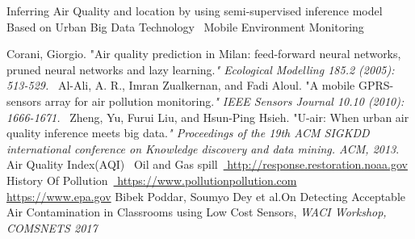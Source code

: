 \begin{thebibliography}{99}
Inferring Air Quality and location by using semi-supervised inference model Based on Urban Big Data Technology\ \url{}
Mobile Environment Monitoring\ \url{}

Corani, Giorgio. "Air quality prediction in Milan: feed-forward neural networks, pruned neural networks and lazy learning.\textit{" Ecological Modelling 185.2 (2005): 513-529.}\ \url{}
Al-Ali, A. R., Imran Zualkernan, and Fadi Aloul. "A mobile GPRS-sensors array for air pollution monitoring.\textit{" IEEE Sensors Journal 10.10 (2010): 1666-1671.}\ \url{}
Zheng, Yu, Furui Liu, and Hsun-Ping Hsieh. "U-air: When urban air quality inference meets big data.\textit{" Proceedings of the 19th ACM SIGKDD international conference on Knowledge discovery and data mining. ACM, 2013}.
Air Quality Index(AQI)\ \url{}
Oil and Gas spill\ \url{ http://response.restoration.noaa.gov}
 History Of Pollution\ \url{ https://www.pollutionpollution.com}
 \ \url{ https://www.epa.gov}
 Bibek Poddar, Soumyo Dey et al.On Detecting Acceptable Air Contamination in Classrooms using Low Cost Sensors,\textit{ WACI Workshop, COMSNETS 2017}\\
 

\end{thebibliography}
